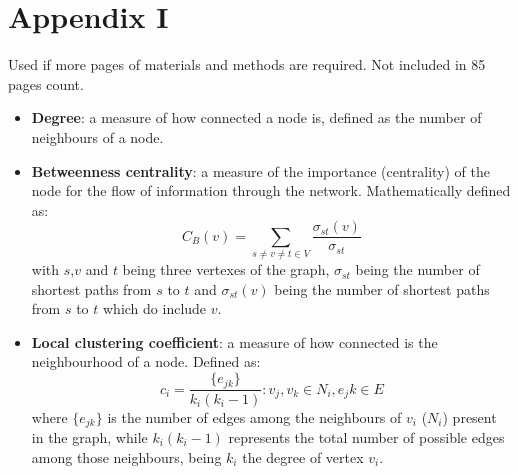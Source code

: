 \graphicspath{{chapters/90_appendix_i/}}
\chapter*{Appendix I}

Used if more pages of materials and methods are required. Not included in 85 pages count.

\begin{itemize}\tightlist
  \item \textbf{Degree}: a measure of how connected a node is, defined as the number of neighbours of a node.
  \item \textbf{Betweenness centrality}: a measure of the importance (centrality) of the node for the flow of information through the network. Mathematically defined as:
  $$C_B(v) = \sum_{s \neq v \neq t \in V} \frac{\sigma_{st}(v)}{\sigma_{st}}$$
  with $s$,$v$ and $t$ being three vertexes of the graph, $\sigma_{st}$ being the number of shortest paths from $s$ to $t$ and $\sigma_{st}(v)$ being the number of shortest paths from $s$ to $t$ which do include $v$.
  \item \textbf{Local clustering coefficient}: a measure of how connected is the neighbourhood of a node. Defined as:
  $$c_i = \frac{\{e_{jk}\}}{k_i(k_i-1)} : v_j,v_k \in N_i, e_jk \in E$$
  where $\{e_{jk}\}$ is the number of edges among the neighbours of $v_i$ ($N_i$) present in the graph, while $k_i(k_i-1)$ represents the total number of possible edges among those neighbours, being $k_i$ the degree of vertex $v_i$.
\end{itemize}